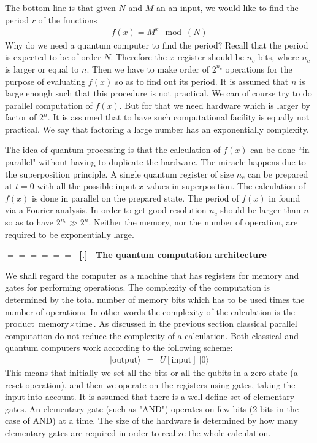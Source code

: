 \documentclass[onecolumn,fleqn]{revtex4}
\newcommand{\beq}{\begin{eqnarray}}
\newcommand{\eeq}{\end{eqnarray}}
\renewcommand{\thesubsection}{\arabic{subsection}}
\renewcommand{\thesubsubsection}{\arabic{subsubsection}}
\newcommand{\sheadC}[1]
{
\addtocounter{subsubsection}{1}
\vspace{5mm}
{\Large\bf $=\!=\!=\!=\!=\!=\;$ [\thesubsection.\thesubsubsection] \ #1}  
\nopagebreak
\phantomsection
}
\begin{document}
The bottom line is that given $N$ and $M$ an an input,  
we would like to find the period $r$ of the functions 
\beq
f(x) = M^x \mod(N) 
\eeq
Why do we need a quantum computer to find the period?   
Recall that the period is expected to be of order $N$.
Therefore the $x$ register should be $n_c$ bits, 
where $n_c$ is larger or equal to $n$. 
Then we have to make order of $2^{n_c}$ operations 
for the purpose of evaluating $f(x)$ so as to find out 
its period. It is assumed that $n$ is large enough such that this 
procedure is not practical. We can of course try to do 
parallel computation of $f(x)$. But for that we need 
hardware which is larger by factor of $2^n$. It is assumed that 
to have such computational facility is equally not practical.
We say that factoring a large number has an exponentially complexity. 



The idea of quantum processing is that the calculation of $f(x)$ 
can be done ``in parallel" without having to duplicate 
the hardware. The miracle happens due to the superposition principle. 
A single quantum register of size $n_c$ can be prepared at $t=0$ with 
all the possible input $x$ values in superposition. 
The calculation of $f(x)$ is done in parallel on the 
prepared state. The period of $f(x)$ in found via a Fourier analysis. 
In order to get good resolution $n_c$ should be larger 
than $n$ so as to have $2^{n_c}\gg 2^n$. 
Neither the memory, nor the number of operation, 
are required to be exponentially large. 
         


\sheadC{The quantum computation architecture}

We shall regard the computer as a machine that has registers 
for memory and gates for performing operations. The complexity 
of the computation is determined by the total 
number of memory bits which has to be used times 
the number of operations. In other words the complexity 
of the calculation is the product ${ \mbox{memory}\times\mbox{time} }$. 
As discussed in the previous 
section classical parallel computation do not  
reduce the complexity of a calculation.  
Both classical and quantum computers 
work according to the following scheme:
\beq
|\mbox{output}\rangle \ \ = \ \ U[\mbox{input}] \ |0\rangle
\eeq
This means that initially we set all the bits or all the qubits 
in a zero state (a reset operation), and then we operate 
on the registers using gates, taking the input 
into account. It is assumed that there is a well define 
set of elementary gates. An elementary gate (such as "AND")  
operates on few bits (2 bits in the case of AND) 
at a time. The size of the hardware is determined by how 
many elementary gates are required in order to realize 
the whole calculation.
\end{document}
